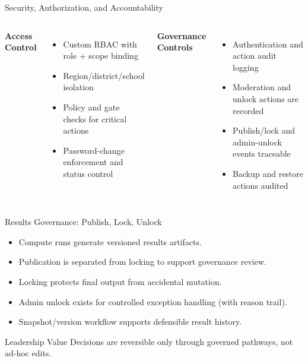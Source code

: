 \documentclass[aspectratio=169,11pt]{beamer}
\begin{document}
\begin{frame}{Security, Authorization, and Accountability}
\begin{columns}[T]
\textbf{Access Control}
\begin{itemize}
  \item Custom RBAC with role + scope binding
  \item Region/district/school isolation
  \item Policy and gate checks for critical actions
  \item Password-change enforcement and status control
\end{itemize}

\textbf{Governance Controls}
\begin{itemize}
  \item Authentication and action audit logging
  \item Moderation and unlock actions are recorded
  \item Publish/lock and admin-unlock events traceable
  \item Backup and restore actions audited
\end{itemize}
\end{columns}
\end{frame}

\begin{frame}{Results Governance: Publish, Lock, Unlock}
\begin{itemize}
  \item Compute runs generate versioned results artifacts.
  \item Publication is separated from locking to support governance review.
  \item Locking protects final output from accidental mutation.
  \item Admin unlock exists for controlled exception handling (with reason trail).
  \item Snapshot/version workflow supports defensible result history.
\end{itemize}
\vspace{0.2cm}
\begin{block}{Leadership Value}
Decisions are reversible only through governed pathways, not ad-hoc edits.
\end{block}
\end{frame}
\end{document}
